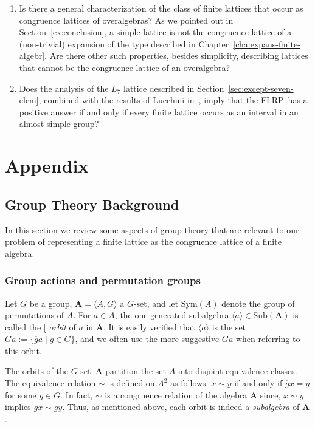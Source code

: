\documentclass[cm,dissertation,actual,final]{uhthesis}
\theoremstyle{plain}
\theoremstyle{definition}
\theoremstyle{remark}
\numberwithin{theorem}{section}
\numberwithin{claim}{chapter}
\numberwithin{equation}{section}
\numberwithin{conjecture}{chapter}
\newcommand{\<}{\ensuremath{\langle}}
\renewcommand{\>}{\ensuremath{\rangle}}
\newcommand{\Sub}{\ensuremath{\mathrm{Sub}}}
\newcommand{\Sym}{\ensuremath{\mathrm{Sym}}}
\newcommand{\FLRP}{{\small FLRP}}
\newcommand{\0}{\ensuremath{\mathbf{0}}}
\newcommand{\1}{\ensuremath{\mathbf{1}}}
\newcommand{\2}{\ensuremath{\mathbf{2}}}
\newcommand{\3}{\ensuremath{\mathbf{3}}}
\newcommand{\4}{\ensuremath{\mathbf{4}}}
\newcommand{\5}{\ensuremath{\mathbf{5}}}
\newcommand{\bA}{\ensuremath{\mathbf{A}}}
\newcommand{\barG}{\ensuremath{\overline{G}}}
\newcommand{\barg}{\ensuremath{\overline{g}}}
\newcommand{\Gset}{\ensuremath{G\text{-set}}}
\newcommand{\indexit}[1]{\index{#1|textit}}
\def\defn#1{\gdef\defnstring{#1}%
  \xdef\dodefnii{{\noexpand\em
       \defnstring}\noexpand\indexit{\defnstring}\noexpand\makeatother}%
  \futurelet\nextthing\dodefn}
\def\dodefn{%
  \ifx\nextthing[\let\next=\dodefni
    \else\let\next=\dodefnii\fi
  \makeatletter
  \next}
\def\dodefni[#1]{%
  {\em\defnstring}%
  \indexit{#1}%
  \makeatother}
\begin{document}
\begin{enumerate}
\item Is there a general characterization of the class of finite lattices that
  occur as congruence lattices of overalgebras?  As we pointed out in
  Section~\ref{ex:conclusion}, a simple lattice is not the congruence lattice
  of a (non-trivial) expansion of the type described in
  Chapter~\ref{cha:expans-finite-algebr}.  Are there other such
  properties, besides simplicity, describing lattices that cannot be
  the congruence lattice of an overalgebra?

\item Does the analysis of the $L_7$ lattice described in
  Section~\ref{sec:except-seven-elem}, combined with the results of Lucchini
  in~\cite{Lucchini:1994a}, imply that the \FLRP\ has a positive answer if and
  only if every finite lattice occurs as an interval in an almost simple group?
\end{enumerate}

\appendix

\part{Appendix}
\chapter{Group Theory Background}
\label{cha:group-theory-backgr}
In this section we review some aspects of group theory that
are relevant to our problem of representing a finite lattice as the congruence
lattice of a finite algebra.

\section{Group actions and permutation groups}
\label{sec:group-acti-perm}
Let $G$ be a group, $\bA= \<A, \barG\>$ a \Gset, and let $\Sym(A)$ denote the group of
permutations of $A$.
For $a\in A$, the one-generated subalgebra $\<a\>\in \Sub(\bA)$ is
called the \defn{orbit} of $a$ in $\bA$. 
It is easily verified that $\<a\>$ is the set
$ \barG a :=  \{\barg a \mid g\in G\}$, and we often use the more suggestive 
$\barG a$ when referring to this orbit.

The orbits of the \Gset\ $\bA$ partition the set $A$ into disjoint
equivalence classes.  The equivalence relation $\sim$ is defined on $A^2$ as follows: 
$x \sim y$ if and only if $\barg x = y$ for some $g\in G$.
In fact, $\sim$ is a congruence relation of the algebra $\bA$ since,
$x \sim y$ implies $\barg x \sim \barg y$.
Thus, as mentioned above, each orbit is indeed a \emph{subalgebra} of $\bA$.
\end{document}
